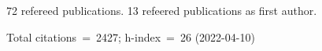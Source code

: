 72 refereed publications. 13 refeered publications as first author.

Total citations~=~2427; h-index~=~26 (2022-04-10)